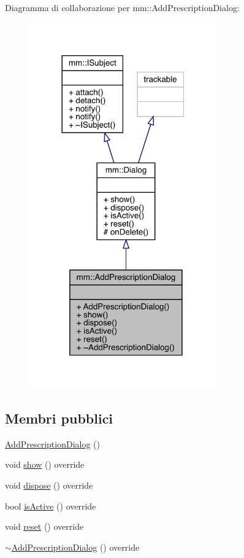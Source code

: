 Diagramma di collaborazione per mm\+:\+:Add\+Prescription\+Dialog\+:
\nopagebreak
\begin{figure}[H]
\begin{center}
\leavevmode
\includegraphics[width=228pt]{d6/dff/classmm_1_1_add_prescription_dialog__coll__graph}
\end{center}
\end{figure}
\subsection*{Membri pubblici}
\begin{DoxyCompactItemize}
\item 
\mbox{\hyperlink{classmm_1_1_add_prescription_dialog_a0956469781e124fbfd283212bf1796ec}{Add\+Prescription\+Dialog}} ()
\item 
void \mbox{\hyperlink{classmm_1_1_add_prescription_dialog_aa1c86141b2d45e141684bd99d557b8e4}{show}} () override
\item 
void \mbox{\hyperlink{classmm_1_1_add_prescription_dialog_aacb58c7617be2323d91cd5ab2f28e354}{dispose}} () override
\item 
bool \mbox{\hyperlink{classmm_1_1_add_prescription_dialog_a4ff93500e8fd90512dc4575147b2c910}{is\+Active}} () override
\item 
void \mbox{\hyperlink{classmm_1_1_add_prescription_dialog_a6ace04587432a197436bb04c7b68d60d}{reset}} () override
\item 
\mbox{\hyperlink{classmm_1_1_add_prescription_dialog_aef188f7c530ca399b6bd44bbb4472085}{$\sim$\+Add\+Prescription\+Dialog}} () override
\end{DoxyCompactItemize}
